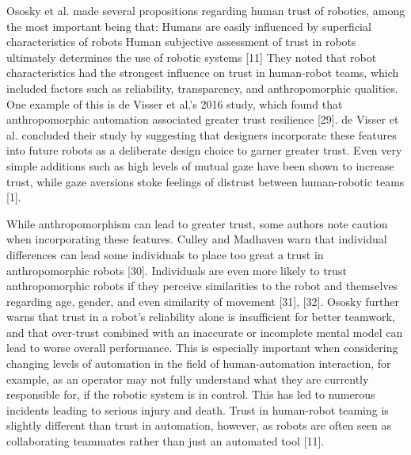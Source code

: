 Ososky et al. made several propositions regarding human trust of robotics, among the most important being that:
	Humans are easily influenced by superficial characteristics of robots
	Human subjective assessment of trust in robots ultimately determines the use of robotic systems [11]
They noted that robot characteristics had the strongest influence on trust in human-robot teams, which included factors such as reliability, transparency, and anthropomorphic qualities. One example of this is de Visser et al.'s 2016 study, which found that anthropomorphic automation associated greater trust resilience [29]. de Visser et al. concluded their study by suggesting that designers incorporate these features into future robots as a deliberate design choice to garner greater trust. Even very simple additions such as high levels of mutual gaze have been shown to increase trust, while gaze aversions stoke feelings of distrust between human-robotic teams [1].

While anthropomorphism can lead to greater trust, some authors note caution when incorporating these features. Culley and Madhaven warn that individual differences can lead some individuals to place too great a trust in anthropomorphic robots [30]. Individuals are even more likely to trust anthropomorphic robots if they perceive similarities to the robot and themselves regarding age, gender, and even similarity of movement [31], [32]. Ososky further warns that trust in a robot's reliability alone is insufficient for better teamwork, and that over-trust combined with an inaccurate or incomplete mental model can lead to worse overall performance. This is especially important when considering changing levels of automation in the field of human-automation interaction, for example, as an operator may not fully understand what they are currently responsible for, if the robotic system is in control. This has led to numerous incidents leading to serious injury and death. Trust in human-robot teaming is slightly different than trust in automation, however, as robots are often seen as collaborating teammates rather than just an automated tool [11].

